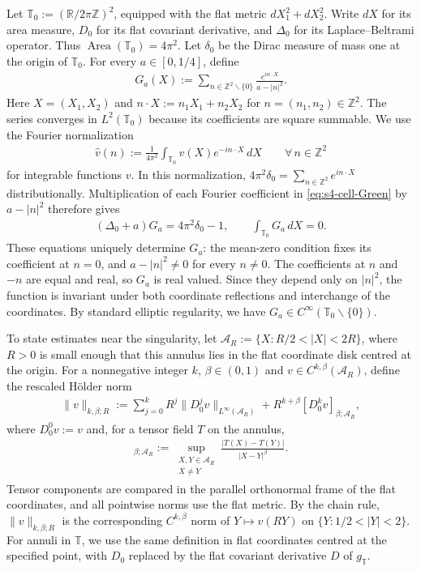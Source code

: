 \documentclass[a4paper,11pt,oneside,reqno]{amsart}
\numberwithin{equation}{section}
\theoremstyle{definition}
\begin{document}
Let $\mathbb T_0:=(\mathbb R/2\pi\mathbb Z)^2$, equipped with
the flat metric $dX_1^2+dX_2^2$. Write $dX$ for its area
measure, $D_0$ for its flat covariant derivative, and $\Delta_0$
for its Laplace--Beltrami operator. Thus
$\operatorname{Area}(\mathbb T_0)=4\pi^2$. Let $\delta_0$ be
the Dirac measure of mass one at the origin of $\mathbb T_0$.
For every $a\in[0,1/4]$, define
%
\begin{align}
    \label{eq:s4-cell-Green}
    G_a(X):=\sum_{n\in\mathbb Z^2\smallsetminus\{0\}}
    \frac{e^{in\cdot X}}{a-|n|^2}.
\end{align}
%
Here $X=(X_1,X_2)$ and $n\cdot X:=n_1X_1+n_2X_2$ for
$n=(n_1,n_2)\in\mathbb Z^2$. The series converges in
$L^2(\mathbb T_0)$ because its coefficients are square
summable. We use the Fourier normalization
%
\begin{align*}
    \widehat v(n):=\frac1{4\pi^2}
    \int_{\mathbb T_0}v(X)e^{-in\cdot X}\,dX
    \qquad\forall\,n\in\mathbb Z^2
\end{align*}
%
for integrable functions $v$. In this normalization,
$4\pi^2\delta_0=\sum_{n\in\mathbb Z^2}e^{in\cdot X}$ distributionally. Multiplication of each Fourier coefficient
in \eqref{eq:s4-cell-Green} by $a-|n|^2$ therefore gives
%
\begin{align}
    \label{eq:s4-cell-equation}
    (\Delta_0+a)G_a=4\pi^2\delta_0-1,
    \qquad \int_{\mathbb T_0}G_a\,dX=0.
\end{align}
%
These equations uniquely determine $G_a$: the mean-zero
condition fixes its coefficient at $n=0$, and
$a-|n|^2\neq0$ for every $n\neq0$. The coefficients at $n$
and $-n$ are equal and real, so $G_a$ is real valued. Since
they depend only on $|n|^2$, the function is invariant under
both coordinate reflections and interchange of the coordinates.
By standard elliptic regularity, we have
$G_a\in C^\infty(\mathbb T_0\smallsetminus\{0\})$.

To state estimates near the singularity, let
$\mathcal A_R:=\{X:R/2<|X|<2R\}$, where $R>0$ is small
enough that this annulus lies in the flat coordinate disk
centred at the origin. For a nonnegative integer $k$,
$\beta\in(0,1)$ and $v\in C^{k,\beta}(\mathcal A_R)$, define the rescaled H\"older norm
%
\begin{align*}
    \|v\|_{k,\beta;R}
    :=\sum_{j=0}^kR^j\|D_0^jv\|_{L^\infty(\mathcal A_R)}
    +R^{k+\beta}[D_0^kv]_{\beta;\mathcal A_R},
\end{align*}
%
where $D_0^0v:=v$ and, for a tensor field $T$ on the annulus,
%
\begin{align*}
    [T]_{\beta;\mathcal A_R}
    :=\sup_{\substack{X,Y\in\mathcal A_R\\X\neq Y}}
    \frac{|T(X)-T(Y)|}{|X-Y|^\beta}.
\end{align*}
%
Tensor components are compared in the parallel orthonormal
frame of the flat coordinates, and all pointwise norms use
the flat metric. By the chain rule, $\|v\|_{k,\beta;R}$ is
the corresponding $C^{k,\beta}$ norm of $Y\mapsto v(RY)$
on $\{Y:1/2<|Y|<2\}$. For annuli in $\mathbb T$, we use
the same definition in flat coordinates centred at the
specified point, with $D_0$ replaced by the flat covariant
derivative $D$ of $g_{\mathbb T}$.
\end{document}
